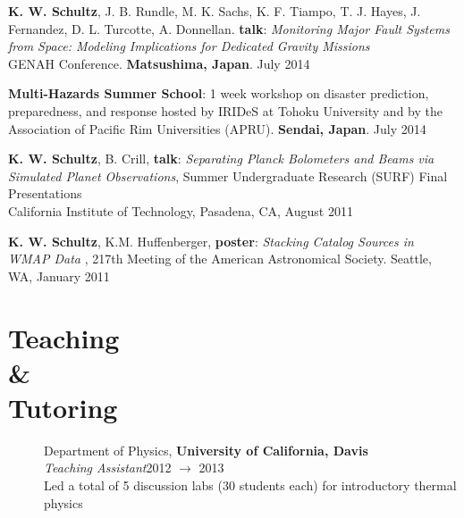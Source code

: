 \documentclass[margin,line]{resume}
\begin{document}
\begin{resume}
\begin{description}
    \newpage

    \item[] \textbf{K. W. Schultz}, J. B. Rundle, M. K. Sachs, K. F. Tiampo, T. J. Hayes, J. Fernandez, D. L. Turcotte, A. Donnellan. \textbf{talk}: \emph{Monitoring Major Fault Systems from Space: Modeling Implications for Dedicated Gravity Missions} \\ GENAH Conference. \textbf{Matsushima, Japan}. July 2014 \\
    
   \item[] \textbf{Multi-Hazards Summer School}: 1 week workshop on disaster prediction, preparedness, and response hosted by IRIDeS at Tohoku University and by the Association of Pacific Rim Universities (APRU). \textbf{Sendai, Japan}. July 2014 \\

    \item[]  \textbf{K. W. Schultz}, B. Crill, \textbf{talk}:  \emph{Separating Planck Bolometers and Beams via Simulated Planet Observations}, Summer Undergraduate Research (SURF) Final Presentations \\ California Institute of Technology, Pasadena, CA, August 2011 \\

    \item[]  \textbf{K. W. Schultz}, K.M. Huffenberger, \textbf{poster}: \emph{Stacking Catalog Sources in WMAP Data }, 217th Meeting of the American Astronomical Society. Seattle, WA, January 2011



\end{description}




\section{\mysidestyle \textbf{Teaching} \\ \textbf{\&} \\ \textbf{Tutoring}}
\begin{description}

    \item[] \normalsize Department of Physics, \textbf{University of California, Davis} \\
    \emph{Teaching Assistant}\hfill 2012 $\rightarrow$ 2013 \\
    Led a total of 5 discussion labs (30 students each) for introductory thermal physics


\end{description}
\end{resume}
\end{document}
